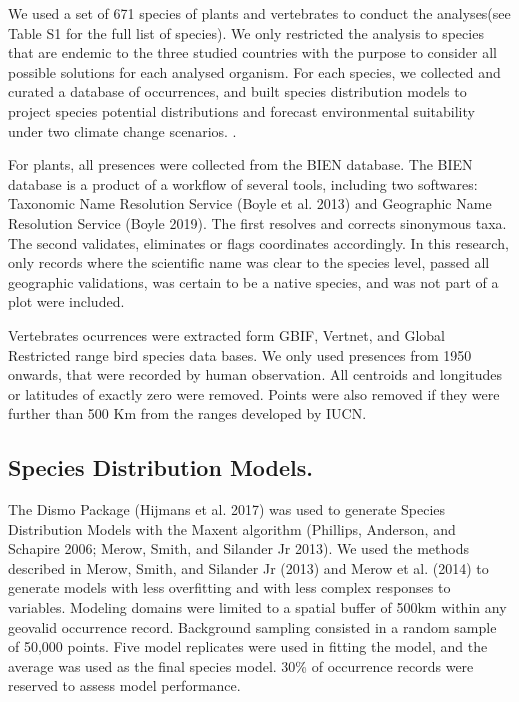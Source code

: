 \documentclass[]{article}
\begin{document}
We used a set of 671 species of plants and vertebrates to conduct the analyses(see Table S1 for the full list of species). We only restricted the analysis to species that are endemic to the three studied countries with the purpose to consider all possible solutions for each analysed organism. For each species, we collected and curated a database of occurrences, and built species distribution models to project species potential distributions and forecast environmental suitability under two climate change scenarios.
.

For plants, all presences were collected from the BIEN database. The BIEN database is a product of a workflow of several tools, including two softwares: Taxonomic Name Resolution Service (Boyle et al. 2013) and Geographic Name Resolution Service (Boyle 2019). The first resolves and corrects sinonymous taxa. The second validates, eliminates or flags coordinates accordingly. In this research, only records where the scientific name was clear to the species level, passed all geographic validations, was certain to be a native species, and was not part of a plot were included.

Vertebrates ocurrences were extracted form GBIF, Vertnet, and Global Restricted range bird species data bases. We only used presences from 1950 onwards, that were recorded by human observation. All centroids and longitudes or latitudes of exactly zero were removed. Points were also removed if they were further than 500 Km from the ranges developed by IUCN.

\hypertarget{species-distribution-models.}{%
\subsection{Species Distribution Models.}\label{species-distribution-models.}}

The Dismo Package (Hijmans et al. 2017) was used to generate Species Distribution Models with the Maxent algorithm (Phillips, Anderson, and Schapire 2006; Merow, Smith, and Silander Jr 2013). We used the methods described in Merow, Smith, and Silander Jr (2013) and Merow et al. (2014) to generate models with less overfitting and with less complex responses to variables. Modeling domains were limited to a spatial buffer of 500km within any geovalid occurrence record. Background sampling consisted in a random sample of 50,000 points. Five model replicates were used in fitting the model, and the average was used as the final species model. 30\% of occurrence records were reserved to assess model performance.
\end{document}
